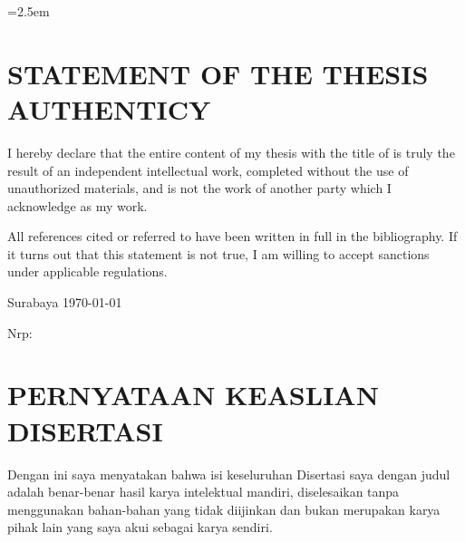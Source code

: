 \normalsize
{}
\singlespacing
{}
\emergencystretch=2.5em

\cleardoublepage

\cleardoublepage

{
	{
		\chapter*{STATEMENT OF THE THESIS AUTHENTICY}


		\begin{spacing}{1.5}

			I hereby declare that the entire content of my thesis with the title of \textbf{\JdTesisEng} is truly the result of an independent intellectual work, completed without the use of unauthorized materials, and is not the work of another party which I acknowledge as my work.

			All references cited or referred to have been written in full in the bibliography. If it turns out that this statement is not true, I am willing to accept sanctions under applicable regulations.

			\hspace{35ex}Surabaya \today

			\vspace{10ex}

			\hspace{35ex}\underline{\NamaMahasiswa}

			\hspace{35ex}Nrp: \NrpMahasiswa

		\end{spacing}
		\cleardoublepage

	}
	{

		\chapter*{PERNYATAAN KEASLIAN DISERTASI}

		\begin{spacing}{1.5}

			Dengan ini saya menyatakan bahwa isi keseluruhan Disertasi  saya dengan judul \textbf{\JdTesis} adalah benar-benar hasil karya intelektual mandiri, diselesaikan tanpa menggunakan bahan-bahan yang tidak diijinkan dan bukan merupakan karya pihak lain yang saya akui sebagai karya sendiri.


\end{spacing}}}
